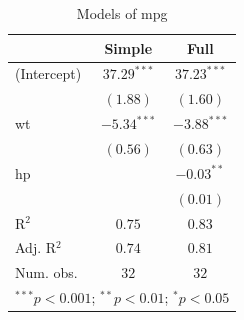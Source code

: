 
\begin{table}[ht]
\begin{center}
\begin{tabular}{l c c}
\hline
 & Simple & Full \\
\hline
(Intercept) & $37.29^{***}$ & $37.23^{***}$ \\
            & $(1.88)$      & $(1.60)$      \\
wt          & $-5.34^{***}$ & $-3.88^{***}$ \\
            & $(0.56)$      & $(0.63)$      \\
hp          &               & $-0.03^{**}$  \\
            &               & $(0.01)$      \\
\hline
R$^2$       & $0.75$        & $0.83$        \\
Adj. R$^2$  & $0.74$        & $0.81$        \\
Num. obs.   & $32$          & $32$          \\
\hline
\multicolumn{3}{l}{\scriptsize{$^{***}p<0.001$; $^{**}p<0.01$; $^{*}p<0.05$}}
\end{tabular}
\caption{Models of mpg}
\label{tab:mpg}
\end{center}
\end{table}
